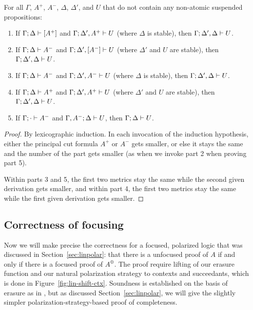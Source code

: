 \bigskip
\begin{theorem}\label{thm:lincut}
For all $\Gamma$, $A^+$, $A^-$, $\Delta$, $\Delta'$, and $U$ that
do not contain any non-atomic suspended propositions:
\begin{enumerate}
\item If ${\Gamma};{\Delta} \vdash {[A^+]} \mathstrut$
      and ${\Gamma};{\Delta',A^+} \vdash {U} \mathstrut$
      (where $\Delta$ is stable), 
      then ${\Gamma};{\Delta',\Delta} \vdash {U} \mathstrut$.
\item If ${\Gamma};{\Delta} \vdash {A^-} \mathstrut$
      and ${\Gamma};{\Delta', [A^-]} \vdash {U} \mathstrut$
      (where $\Delta'$ and $U$ are stable),
      then ${\Gamma};{\Delta',\Delta} \vdash {U} \mathstrut$. 
\item If ${\Gamma};{\Delta} \vdash {A^-} \mathstrut$
      and ${\Gamma};{\Delta', A^-} \vdash {U} \mathstrut$
      (where $\Delta$ is stable), 
      then ${\Gamma};{\Delta',\Delta} \vdash {U} \mathstrut$. 
\item If ${\Gamma};{\Delta} \vdash {A^+} \mathstrut$
      and ${\Gamma};{\Delta', A^+} \vdash {U} \mathstrut$
      (where $\Delta'$ and $U$ are stable),
      then ${\Gamma};{\Delta',\Delta} \vdash {U} \mathstrut$. 
\item If ${\Gamma};{\cdot} \vdash {A^-} \mathstrut$
      and ${\Gamma, A^-};{\Delta} \vdash {U} \mathstrut$,
      then ${\Gamma};{\Delta} \vdash {U} \mathstrut$. 
\end{enumerate}
\end{theorem}

\begin{proof}
By lexicographic induction. In each invocation of the induction
hypothesis, either the principal cut formula $A^+$ or $A^-$ gets 
smaller, or else it stays the same and the number of the part
gets smaller (as when we invoke part 2 when proving part 5). 

Within parts 3 and 5, the first two metrics stay the same while the
second given derivation gets smaller, and within part 4, the first two
metrics stay the same while the first given derivation gets smaller.
\end{proof}

\subsection{Correctness of focusing}



Now we will make precise the correctness for a focused, polarized
logic that was discussed in Section~\ref{sec:linpolar}: that there is
a unfocused proof of $A$ if and only if there is a focused proof of
$A^\oplus$. The proof require lifting of our erasure function and our
natural polarization strategy to contexts and succeedants, which is
done in Figure~\ref{fig:lin-shift-ctx}. Soundness is established on
the basis of erasure as in \cite{simmons11structural}, but as
discussed Section~\ref{sec:linpolar}, we will give the slightly
simpler polarization-strategy-based proof of completeness.

